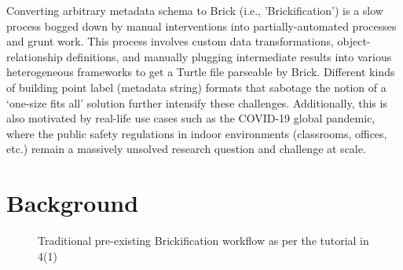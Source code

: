 \documentclass[twocolumn, switch]{article} %
\begin{document}
Converting arbitrary metadata schema to Brick (i.e., 'Brickification') is a slow process bogged down by manual interventions into partially-automated processes and grunt work. This process involves custom data transformations, object-relationship definitions, and manually plugging intermediate results into various heterogeneous frameworks to get a Turtle file parseable by Brick. Different kinds of building point label (metadata string) formats that sabotage the notion of a ‘one-size fits all’ solution further intensify these challenges.  Additionally, this is also motivated by real-life use cases such as the COVID-19 global pandemic, where the public safety regulations in indoor environments (classrooms, offices, etc.) remain a massively unsolved research question and challenge at scale.


\section{Background}

\begin{figure}[H]
  \centering
  \caption{ Traditional pre-existing Brickification workflow as per the tutorial in 4(1) }
  \label{fig:fig1}
\end{figure}
\end{document}

